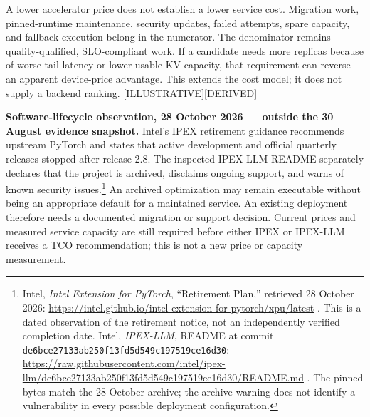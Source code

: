 A lower accelerator price does not establish a lower service cost.
Migration work, pinned-runtime maintenance, security updates, failed
attempts, spare capacity, and fallback execution belong in the
numerator. The denominator remains quality-qualified, SLO-compliant
work. If a candidate needs more replicas because of worse tail latency
or lower usable KV capacity, that requirement can reverse an apparent
device-price advantage. This extends the cost model; it does not supply
a backend ranking. \mbox{{[}ILLUSTRATIVE{]}}\hspace{0pt}\mbox{{[}DERIVED{]}}

\textbf{Software-lifecycle observation, 28 October 2026 --- outside the
30 August evidence snapshot.} Intel's IPEX retirement guidance
recommends upstream PyTorch and states that active development and
official quarterly releases stopped after release 2.8. The inspected
IPEX-LLM README separately declares that the project is archived,
disclaims ongoing support, and warns of known security
issues.\footnote{Intel, \emph{Intel Extension for PyTorch}, ``Retirement
  Plan,'' retrieved 28 October 2026:
  \url{https://intel.github.io/intel-extension-for-pytorch/xpu/latest} . This
  is a dated observation of the retirement notice, not an independently
  verified completion date. Intel, \emph{IPEX-LLM}, README at commit
  \texttt{de6bce27133ab250f13fd5d549c197519ce16d30}:
  \url{https://raw.githubusercontent.com/intel/ipex-llm/de6bce27133ab250f13fd5d549c197519ce16d30/README.md}
  . The pinned bytes match the 28 October archive; the archive warning
  does not identify a vulnerability in every possible deployment
  configuration.} An archived optimization may remain executable without
being an appropriate default for a maintained service. An existing
deployment therefore needs a documented migration or support decision.
Current prices and measured service capacity are still required before
either IPEX or IPEX-LLM receives a TCO recommendation; this is not a new
price or capacity measurement.

\label{common-mistakes}


